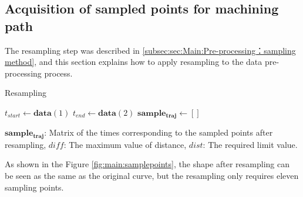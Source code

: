 \subsection{Acquisition of sampled points for machining path }\label{subsec:sec:Main:Pre-processing：sampled points}
The resampling step was described in \ref{subsec:sec:Main:Pre-processing：sampling method}, and this section explains how to apply resampling to the data pre-processing process.\par
\begin{algorithm}
\SetAlgoLined
\caption{Resampling} \label{alg1} 
$t_{start}\gets \boldsymbol{data}(1)$\;
$t_{end}\gets \boldsymbol{data}(2)$\;
$\boldsymbol{sample_{traj}} \gets   \left[ \right]$\;
\end{algorithm}
$ \boldsymbol{sample_{traj}}$: Matrix of the times corresponding to the sampled points after resampling, $diff$: The maximum value of distance, $dist$: The required limit value.\par
As shown in the Figure \ref{fig:main:samplepoints}, the shape after resampling can be seen as the same as the original curve, but the resampling only requires eleven sampling points.
